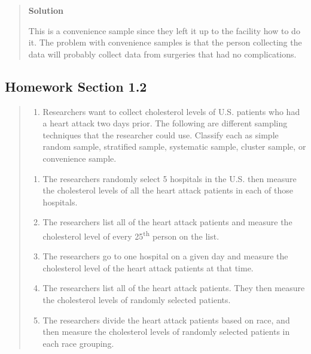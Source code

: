 \documentclass[]{book}
\providecommand{\tightlist}{%
  \setlength{\itemsep}{0pt}\setlength{\parskip}{0pt}}
\begin{document}
\begin{quote}
\textbf{Solution}

This is a convenience sample since they left it up to the facility how to do it. The problem with convenience samples is that the person collecting the data will probably collect data from surgeries that had no complications.
\end{quote}

\hypertarget{homework-section-1.2}{%
\subsection{Homework Section 1.2}\label{homework-section-1.2}}

\begin{quote}
\begin{enumerate}
\def\labelenumi{\arabic{enumi}.}
\tightlist
\item
  Researchers want to collect cholesterol levels of U.S. patients who had a heart attack two days prior. The following are different sampling techniques that the researcher could use. Classify each as simple random sample, stratified sample, systematic sample, cluster sample, or convenience sample.
\end{enumerate}

\begin{enumerate}
\def\labelenumi{\alph{enumi}.}
\tightlist
\item
  The researchers randomly select 5 hospitals in the U.S. then measure the cholesterol levels of all the heart attack patients in each of those hospitals.
\item
  The researchers list all of the heart attack patients and measure the cholesterol level of every 25\textsuperscript{th} person on the list.
\item
  The researchers go to one hospital on a given day and measure the cholesterol level of the heart attack patients at that time.
\item
  The researchers list all of the heart attack patients. They then measure the cholesterol levels of randomly selected patients.
\item
  The researchers divide the heart attack patients based on race, and then measure the cholesterol levels of randomly selected patients in each race grouping.
\end{enumerate}
\end{quote}
\end{document}
